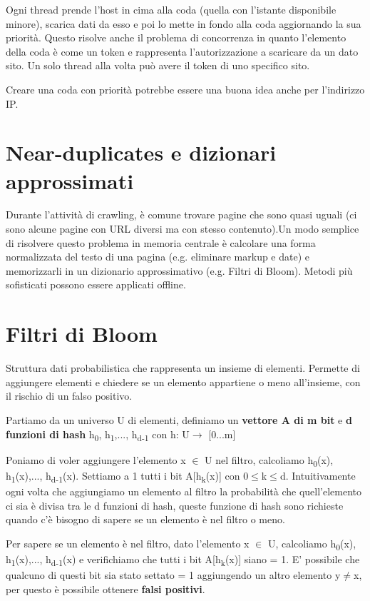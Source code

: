 \documentclass[12pt,italian]{report}
\begin{document}
Ogni thread prende l'host in cima alla coda (quella con l'istante disponibile minore), scarica dati da esso e poi lo mette in fondo alla coda aggiornando la sua priorità. Questo risolve anche il problema di concorrenza in quanto l'elemento della coda è come un token e rappresenta l'autorizzazione a scaricare da un dato sito. Un solo thread alla volta può avere il token di uno specifico sito.

Creare una coda con priorità potrebbe essere una buona idea anche per l'indirizzo IP.

\section{Near-duplicates e dizionari approssimati}
\label{Near-duplicates e dizionari approssimati}
Durante l'attività di crawling, è comune trovare pagine che sono quasi uguali (ci sono alcune pagine con URL diversi ma con stesso contenuto).Un modo semplice di risolvere questo problema in memoria centrale è calcolare una forma normalizzata del testo di una pagina (e.g. eliminare markup e date) e memorizzarli in un dizionario approssimativo (e.g. Filtri di Bloom). Metodi più sofisticati possono essere applicati offline.

\section{Filtri di Bloom}
\label{Filtri di Bloom}
Struttura dati probabilistica che rappresenta un insieme di elementi. Permette di aggiungere elementi e chiedere se un elemento appartiene o meno all'insieme, con il rischio di un falso positivo.

Partiamo da un universo U di elementi, definiamo un \textbf{vettore A di m bit} e \textbf{d funzioni di hash} h\textsubscript{0}, h\textsubscript{1},..., h\textsubscript{d-1} con h: U$\xrightarrow{}$ [0...m] 

\noindent Poniamo di voler aggiungere l'elemento x $\in$ U nel filtro, calcoliamo h\textsubscript{0}(x), h\textsubscript{1}(x),..., h\textsubscript{d-1}(x). Settiamo a 1 tutti i bit A[h\textsubscript{k}(x)] con 0$\leq{}$k$\leq{}$d. 
Intuitivamente ogni volta che aggiungiamo un elemento al filtro la probabilità che quell'elemento ci sia è divisa tra le d funzioni di hash, queste funzione di hash sono richieste quando c'è bisogno di sapere se un elemento è nel filtro o meno. 

\noindent Per sapere se un elemento è nel filtro, dato l'elemento  x $\in$ U, calcoliamo h\textsubscript{0}(x), h\textsubscript{1}(x),..., h\textsubscript{d-1}(x) e verifichiamo che tutti i bit A[h\textsubscript{k}(x)] siano = 1. E' possibile che qualcuno di questi bit sia stato settato = 1 aggiungendo un altro elemento y$\not=$x, per questo è possibile ottenere \textbf{falsi positivi}.
\end{document}
